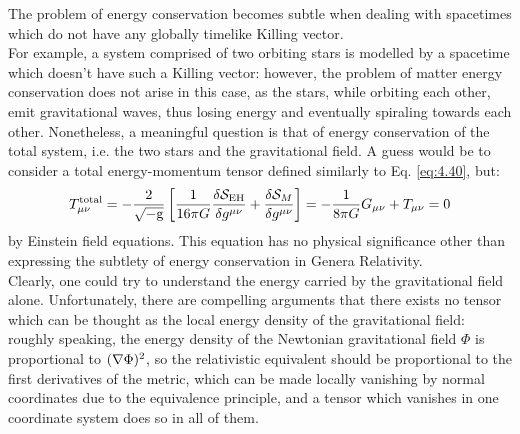 The problem of energy conservation becomes subtle when dealing with spacetimes which do not have any globally timelike Killing vector.\\
For example, a system comprised of two orbiting stars is modelled by a spacetime which doesn't have such a Killing vector: however, the problem of matter energy conservation does not arise in this case, as the stars, while orbiting each other, emit gravitational waves, thus losing energy and eventually spiraling towards each other. Nonetheless, a meaningful question is that of energy conservation of the total system, i.e. the two stars and the gravitational field. A guess would be to consider a total energy-momentum tensor defined similarly to Eq. \ref{eq:4.40}, but:
\begin{equation*}
  T^{\text{total}}_{\mu \nu} = - \frac{2}{\sqrt{-\mathrm{g}}} \left[ \frac{1}{16\pi G} \frac{\delta \mathcal{S}_{\text{EH}}}{\delta g^{\mu \nu}} + \frac{\delta \mathcal{S}_M}{\delta g^{\mu \nu}} \right] = - \frac{1}{8\pi G} G_{\mu \nu} + T_{\mu \nu} = 0
\end{equation*}
by Einstein field equations. This equation has no physical significance other than expressing the subtlety of energy conservation in Genera Relativity.\\
Clearly, one could try to understand the energy carried by the gravitational field alone. Unfortunately, there are compelling arguments that there exists no tensor which can be thought as the local energy density of the gravitational field: roughly speaking, the energy density of the Newtonian gravitational field $ \Phi $ is proportional to $ (\nabla \Phi)^2 $, so the relativistic equivalent should be proportional to the first derivatives of the metric, which can be made locally vanishing by normal coordinates due to the equivalence principle, and a tensor which vanishes in one coordinate system does so in all of them.










